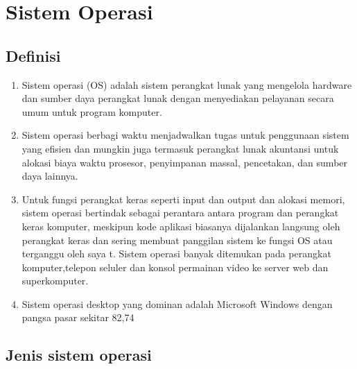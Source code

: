 \section{Sistem Operasi}
	\subsection{Definisi}
		\begin{enumerate}
			\item Sistem operasi (OS) adalah sistem perangkat lunak yang mengelola hardware dan sumber daya perangkat lunak dengan menyediakan pelayanan secara umum untuk program komputer.
			\item Sistem operasi berbagi waktu menjadwalkan tugas untuk penggunaan sistem yang efisien dan mungkin juga termasuk perangkat lunak akuntansi untuk alokasi biaya waktu prosesor, penyimpanan massal, pencetakan, dan sumber daya lainnya.
			\item Untuk fungsi perangkat keras seperti input dan output dan alokasi memori, sistem operasi bertindak sebagai perantara antara program dan perangkat keras komputer, meskipun kode aplikasi biasanya dijalankan langsung oleh perangkat keras dan sering membuat panggilan sistem ke fungsi OS atau terganggu oleh saya t. Sistem operasi banyak ditemukan pada perangkat komputer,telepon seluler dan konsol permainan video ke server web dan superkomputer.
			\item Sistem operasi desktop yang dominan adalah Microsoft Windows dengan pangsa pasar sekitar 82,74%
		\end{enumerate}

\subsection{Jenis sistem operasi}
